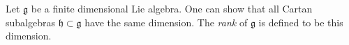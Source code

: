 \documentclass{article}
\newcommand{\lh}{\mathfrak{h}}
\newcommand{\lag}{\mathfrak{g}}
\begin{document}
Let $\lag$ be a finite dimensional Lie algebra.
One can show that all Cartan subalgebras $\lh\subset\lag$ have the same
dimension. The \emph{rank} of $\lag$ is defined to be this dimension.
\end{document}
